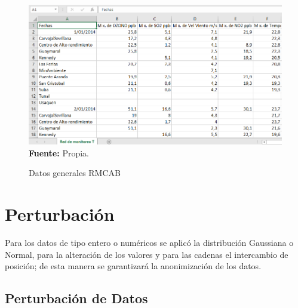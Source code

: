\documentclass[a4paper,openright,12pt]{book}
\theoremstyle{definition}
\theoremstyle{remark}
\begin{document}
\begin{enumerate}
\begin{enumerate}
\begin{figure}[ht]
\centering
\caption{Datos generales  RMCAB} 
\includegraphics[scale=0.4]{VgRMCAB}
\label{fig:1_OpenSSL}
\\ \textbf{Fuente:} Propia.
\end{figure}        
 
         \end{enumerate}
          \end{enumerate}

\section{Perturbación}
Para los datos de tipo entero o numéricos se aplicó la distribución Gaussiana o Normal, para la alteración de los valores y para las cadenas el intercambio de posición; de esta manera se garantizará la anonimización de los datos.
    
    \subsection{Perturbación de Datos}
\end{document}
